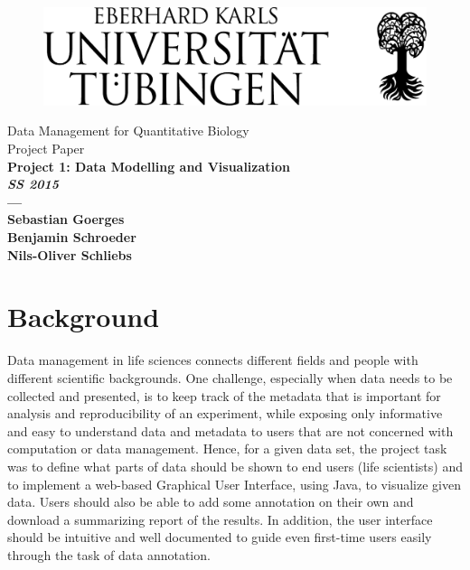 \documentclass[a4paper, 11pt]{article}
\begin{document}
\begin{titlepage}
    \begin{figure}[htp]
        \centering
        \includegraphics[scale=0.65]{unilogo.pdf}
    \end{figure}

    \begin{center}
        \sc
        \rm
        \vspace{2cm}
        \Huge \mdseries Data Management for Quantitative Biology \\[2.0cm]
        \Huge \mdseries Project Paper \\[2.0cm]
	      \LARGE \bfseries Project 1: Data Modelling and Visualization \\[2cm]
        \large \textit{SS 2015}\\[0.125cm]
        \Huge \bfseries ---\\[0.5cm]
        \Large \mdseries Sebastian Goerges  \\ 
        \Large \mdseries Benjamin Schroeder  \\ 
        \Large \mdseries Nils-Oliver Schliebs  \\
        \large \date{\today}
    \end{center}
\end{titlepage}

\newpage
\section{Background}
Data management in life sciences connects different fields and people with different scientific backgrounds. One challenge, especially when data needs to be collected and presented, is to keep track of the metadata that is important for analysis and reproducibility of an experiment, while exposing only informative and easy to understand data and metadata to users that are not concerned with computation or data management. Hence, for a given data set, the project task was to define what parts of data should be shown to end users (life scientists) and to implement a web-based Graphical User Interface, using Java, to visualize given data. Users should also be able to add some annotation on their own and download a summarizing report of the results. In addition, the user interface should be intuitive and well documented to guide even first-time users easily through the task
of data annotation.
\end{document}
